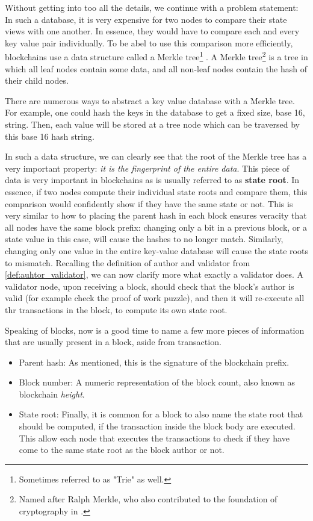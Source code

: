 Without getting into too all the details, we continue with a problem statement: In such a database,
it is very expensive for two nodes to compare their state views with one another. In essence, they
would have to compare each and every key value pair individually. To be abel to use this comparison
more efficiently, blockchains use a data structure called a Merkle tree\footnote{Sometimes referred
to as "Trie" as well.} \cite{Merkle_1988_tree}. A Merkle tree\footnote{Named after Ralph Merkle, who
also contributed to the foundation of cryptography in \cite{Merkle_1978}.} is a tree in which all
leaf nodes contain some data, and all non-leaf nodes contain the hash of their child nodes.

There are numerous ways to abstract a key value database with a Merkle tree. For example, one could
hash the keys in the database to get a fixed size, base 16, string. Then, each value will be stored
at a tree node which can be traversed by this base 16 hash string.


In such a data structure, we can clearly see that the root of the Merkle tree has a very important
property: \textit{it is the fingerprint of the entire data}. This piece of data is very important in
blockchains as is usually referred to as \textbf{state root}. In essence, if two nodes compute their
individual state roots and compare them, this comparison would confidently show if they have the
same state or not. This is very similar to how to placing the parent hash in each block ensures
veracity that all nodes have the same block prefix: changing only a bit in a previous block, or a
state value in this case, will cause the hashes to no longer match. Similarly, changing only one
value in the entire key-value database will cause the state roots to mismatch. Recalling the
definition of author and validator from \ref{def:auhtor_validator}, we can now clarify more what
exactly a validator does. A validator node, upon receiving a block, should check that the block's
author is valid (for example check the proof of work puzzle), and then it will re-execute all thr
transactions in the block, to compute its own state root.

Speaking of blocks, now is a good time to name a few more pieces of information that are usually
present in a block, aside from transaction.

\begin{itemize}
	\item Parent hash: As mentioned, this is the signature of the blockchain prefix.
	\item Block number: A numeric representation of the block count, also known as blockchain \textit{height}.
	\item State root: Finally, it is common for a block to also name the state root that should be
	computed, if the transaction inside the block body are executed. This allow each node that
	executes the transactions to check if they have come to the same state root as the block author
	or not.
\end{itemize}

